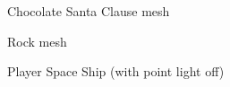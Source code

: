 \documentclass[11pt]{report}
\begin{document}
\begin{figure}[H]
    \begin{minipage}{.5\textwidth}
        \centering
        \caption{Chocolate Santa Clause mesh}
    \end{minipage}
    \begin{minipage}{.5\textwidth}
        \centering
        \caption{Rock mesh}
    \end{minipage}
\end{figure}

\begin{figure}[H]
    \centering
    \caption{Player Space Ship (with point light off)}
\end{figure}
\end{document}
